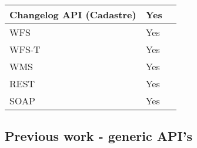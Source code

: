 \begin{table}[H]
\begin{tabular}{|l|l|l|}
		Changelog API (Cadastre)     & Yes                                                                       &                                                                                                                                                                                                                                             \\ \hline
		WFS                          & Yes                                                                       &                                                                                                                                                                                                                                             \\ \hline
		WFS-T                        & Yes                                                                       &                                                                                                                                                                                                                                             \\ \hline
		WMS                          & Yes                                                                       &                                                                                                                                                                                                                                             \\ \hline
		REST                         & Yes                                                                       &                                                                                                                                                                                                                                             \\ \hline
		SOAP                         & Yes                                                                       &                                                                                                                                                                                                                                             \\ \hline
	\end{tabular}
\end{table}




\subsection{Previous work - generic API's}

